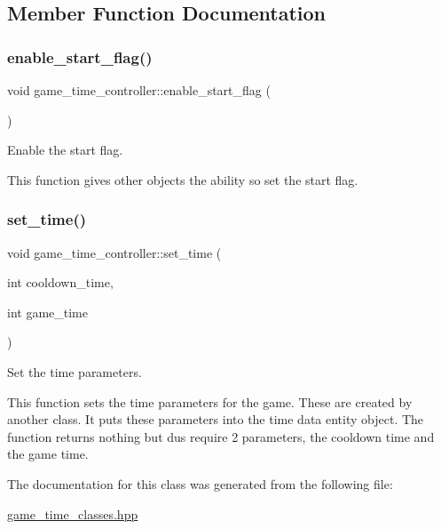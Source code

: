 \subsection{Member Function Documentation}
\hypertarget{classgame__time__controller_a33a1f1c002465109b1caacedbf1a820f}{}\label{classgame__time__controller_a33a1f1c002465109b1caacedbf1a820f} 
\subsubsection{\texorpdfstring{enable\+\_\+start\+\_\+flag()}{enable\_start\_flag()}}
{\footnotesize\ttfamily void game\+\_\+time\+\_\+controller\+::enable\+\_\+start\+\_\+flag (\begin{DoxyParamCaption}{ }\end{DoxyParamCaption})\hspace{0.3cm}{\ttfamily [inline]}}



Enable the start flag. 

This function gives other objects the ability so set the start flag. \hypertarget{classgame__time__controller_a01ace9e573244e15cd28c074792b52f6}{}\label{classgame__time__controller_a01ace9e573244e15cd28c074792b52f6} 
\subsubsection{\texorpdfstring{set\+\_\+time()}{set\_time()}}
{\footnotesize\ttfamily void game\+\_\+time\+\_\+controller\+::set\+\_\+time (\begin{DoxyParamCaption}\item[{int}]{cooldown\+\_\+time,  }\item[{int}]{game\+\_\+time }\end{DoxyParamCaption})\hspace{0.3cm}{\ttfamily [inline]}}



Set the time parameters. 

This function sets the time parameters for the game. These are created by another class. It puts these parameters into the time data entity object. The function returns nothing but dus require 2 parameters, the cooldown time and the game time. 

The documentation for this class was generated from the following file\+:\begin{DoxyCompactItemize}
\item 
\hyperlink{game__time__classes_8hpp}{game\+\_\+time\+\_\+classes.\+hpp}\end{DoxyCompactItemize}

